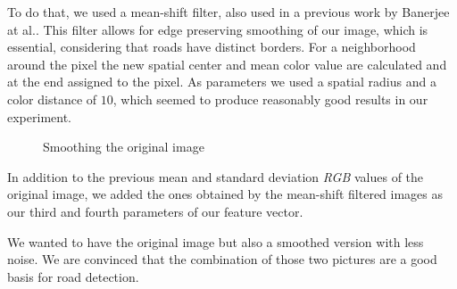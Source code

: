 \documentclass[10pt,conference,compsocconf]{IEEEtran}
\begin{document}
To do that, we used a mean-shift filter, also used in a previous work by Banerjee at al.\cite{BaBuMo12}. This filter allows for edge preserving smoothing of our image, which is essential, considering that roads have distinct borders. For a neighborhood around the pixel the new spatial center and mean color value are calculated and at the end assigned to the pixel. As parameters we used a spatial radius and a color distance of $10$, which seemed to produce reasonably good results in our experiment.

\begin{figure}[t]
	\centering
	\caption{Smoothing the original image}
\end{figure}

In addition to the previous mean and standard deviation \emph{RGB} values of the original image, we added the ones obtained by the mean-shift filtered images as our third and fourth parameters of our feature vector. 

We wanted to have the original image but also a smoothed version with less noise. We are convinced that the combination of those two pictures are a good basis for road detection.
\end{document}
